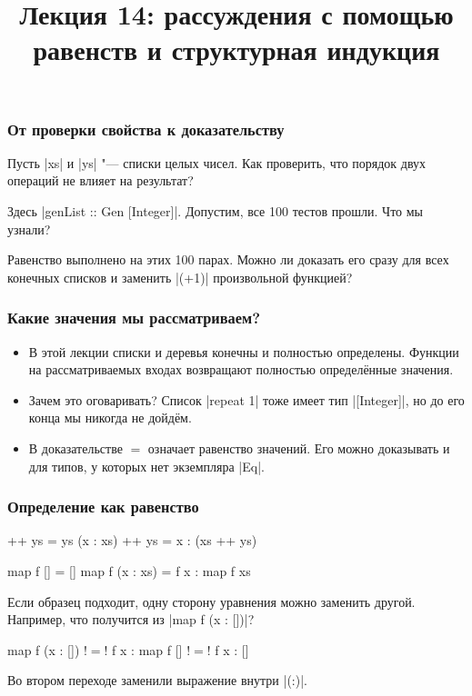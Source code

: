 \documentclass[11pt]{beamer}
\title{Лекция 14: рассуждения с помощью равенств и структурная индукция}
\begin{document}
\begin{frame}[plain]
  \maketitle
\end{frame}

\begin{frame}[fragile]
  \frametitle{От проверки свойства к доказательству}
  Пусть \haskinline|xs| и \haskinline|ys| "--- списки целых чисел. Как проверить, что порядок двух операций не влияет на результат?
  Здесь \haskinline|genList :: Gen [Integer]|. Допустим, все 100 тестов прошли. Что мы узнали? \pause

  Равенство выполнено на этих 100 парах. Можно ли доказать его сразу для всех конечных списков и заменить \haskinline|(+1)| произвольной функцией?
\end{frame}

\begin{frame}[fragile]
  \frametitle{Какие значения мы рассматриваем?}
  \begin{itemize}
    \item В этой лекции списки и деревья конечны и полностью определены. Функции на рассматриваемых входах возвращают полностью определённые значения.
    \item Зачем это оговаривать? Список \haskinline|repeat 1| тоже имеет тип \haskinline|[Integer]|, но до его конца мы никогда не дойдём. \pause
    \item В доказательстве $=$ означает равенство значений. Его можно доказывать и для типов, у которых нет экземпляра \haskinline|Eq|.
  \end{itemize}
\end{frame}

\begin{frame}[fragile]
  \frametitle{Определение как равенство}
  \begin{haskell}
    []       ++ ys = ys
    (x : xs) ++ ys = x : (xs ++ ys)

    map f []       = []
    map f (x : xs) = f x : map f xs
  \end{haskell}
  Если образец подходит, одну сторону уравнения можно заменить другой. Например, что получится из \haskinline|map f (x : [])|? \pause
  \begin{haskell}
      map f (x : [])
    !$=$! f x : map f []
    !$=$! f x : []
  \end{haskell}
  Во втором переходе заменили выражение внутри \haskinline|(:)|.
\end{frame}
\end{document}
